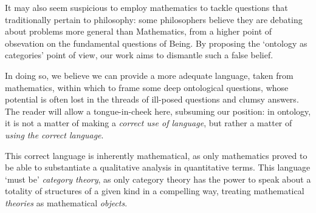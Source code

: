 It may also seem suspicious to employ mathematics to tackle questions that traditionally pertain to philosophy: some philosophers believe they are debating about problems more general than Mathematics, from a higher point of obsevation on the fundamental questions of Being. By proposing the `ontology as categories' point of view, our work aims to dismantle such a false belief.%

In doing so, we believe we can provide a more adequate language, taken from mathematics, within which to frame some deep ontological questions, whose potential is often lost in the threads of ill-posed questions and clumsy answers. The reader will allow a tongue-in-cheek here, subsuming our position: in ontology, it is not a matter of making a \emph{correct use of language}, but rather a matter of \emph{using the correct language}.

This correct language is inherently mathematical, as only mathematics proved to be able to substantiate a qualitative analysis in quantitative terms. This language `must be' \emph{category theory}, as only category theory has the power to speak about a totality of structures of a given kind in a compelling way, treating mathematical \emph{theories} as mathematical \emph{objects}.

